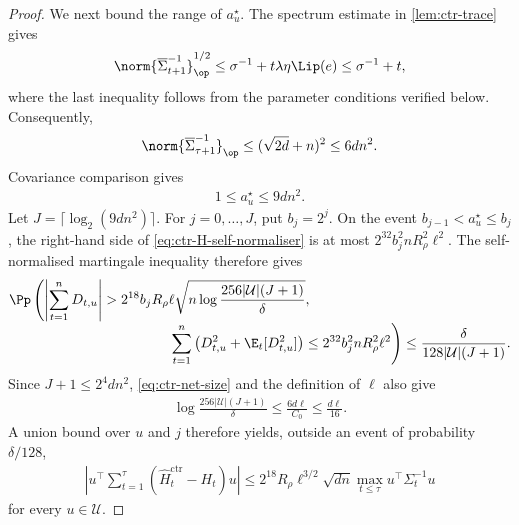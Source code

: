 \begin{proof}
    We next bound the range of $a_u^\star$.  The spectrum estimate in
    \cref{lem:ctr-trace} gives
    \begin{align}
        \norm{\overline\Sigma_{t+1}^{-1}}_{\op}^{1/2}
        \leq\sigma^{-1}+t\lambda\eta\Lip(e)
        \leq\sigma^{-1}+t,
        \label{eq:ctr-predictable-spectrum}
    \end{align}
    where the last inequality follows from the parameter conditions verified
    below.  Consequently,
    \begin{align}
        \norm{\overline\Sigma_{\tau+1}^{-1}}_{\op}
        \leq(\sqrt{2d}+n)^2
        \leq6dn^2.
        \label{eq:ctr-spectrum-upper}
    \end{align}
    Covariance comparison gives
    \begin{align}
        1\leq a_u^\star\leq9dn^2.
        \label{eq:ctr-a-range}
    \end{align}
    Let $J=\lceil\log_2(9dn^2)\rceil$.  For
    $j=0,\ldots,J$, put $b_j=2^j$.  On the event
    $b_{j-1}<a_u^\star\leq b_j$, the right-hand side of
    \eqref{eq:ctr-H-self-normaliser} is at most
    $2^{32}b_j^2nR_\rho^2\ell^2$.  The self-normalised martingale inequality
    therefore gives
    \begin{align}
         & \Pp\left(
        \left|\sum_{t=1}^nD_{t,u}\right|
        >2^{18}b_jR_\rho\ell
        \sqrt{n\log\frac{256|\mathcal U|(J+1)}\delta},
        \right.
        \nonumber             \\[-1mm]
         & \hspace{4cm}\left.
        \sum_{t=1}^n
        \left(D_{t,u}^2+\E_t[D_{t,u}^2]\right)
        \leq2^{32}b_j^2nR_\rho^2\ell^2
        \right)
        \leq\frac{\delta}{128|\mathcal U|(J+1)}.
    \end{align}
    Since $J+1\leq2^{4}dn^2$, \eqref{eq:ctr-net-size} and the definition
    of $\ell$ also give
    \begin{align}
        \log\frac{256|\mathcal U|(J+1)}\delta
        \leq\frac{6d\ell}{C_0}
        \leq\frac{d\ell}{16}.
    \end{align}
    A union bound over $u$ and $j$ therefore yields, outside an event of
    probability $\delta/128$,
    \begin{align}
        \left|
        u^\top\sum_{t=1}^{\tau}
        (\widehat H_t^{\mathrm{ctr}}-H_t)u
        \right|
        \leq2^{18}R_\rho\ell^{3/2}\sqrt{dn}
        \max_{t\leq\tau}u^\top\Sigma_t^{-1}u
        \label{eq:ctr-H-net}
    \end{align}
    for every $u\in\mathcal U$.


\end{proof}

